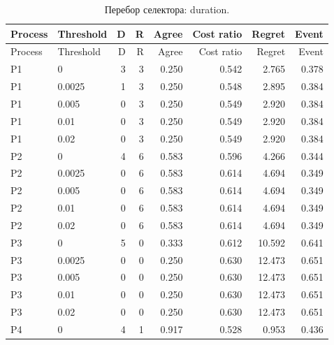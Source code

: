 \begingroup\small\setlength{\tabcolsep}{3pt}\begin{longtable}{llrrrrrr}\caption{Перебор селектора: duration.}\\\toprule

Process & Threshold & D & R & Agree & Cost ratio & Regret & Event\\\midrule\endfirsthead

\toprule Process & Threshold & D & R & Agree & Cost ratio & Regret & Event\\\midrule\endhead

P1 & 0 & 3 & 3 & 0.250 & 0.542 & 2.765 & 0.378\\

P1 & 0.0025 & 1 & 3 & 0.250 & 0.548 & 2.895 & 0.384\\

P1 & 0.005 & 0 & 3 & 0.250 & 0.549 & 2.920 & 0.384\\

P1 & 0.01 & 0 & 3 & 0.250 & 0.549 & 2.920 & 0.384\\

P1 & 0.02 & 0 & 3 & 0.250 & 0.549 & 2.920 & 0.384\\

P2 & 0 & 4 & 6 & 0.583 & 0.596 & 4.266 & 0.344\\

P2 & 0.0025 & 0 & 6 & 0.583 & 0.614 & 4.694 & 0.349\\

P2 & 0.005 & 0 & 6 & 0.583 & 0.614 & 4.694 & 0.349\\

P2 & 0.01 & 0 & 6 & 0.583 & 0.614 & 4.694 & 0.349\\

P2 & 0.02 & 0 & 6 & 0.583 & 0.614 & 4.694 & 0.349\\

P3 & 0 & 5 & 0 & 0.333 & 0.612 & 10.592 & 0.641\\

P3 & 0.0025 & 0 & 0 & 0.250 & 0.630 & 12.473 & 0.651\\

P3 & 0.005 & 0 & 0 & 0.250 & 0.630 & 12.473 & 0.651\\

P3 & 0.01 & 0 & 0 & 0.250 & 0.630 & 12.473 & 0.651\\

P3 & 0.02 & 0 & 0 & 0.250 & 0.630 & 12.473 & 0.651\\

P4 & 0 & 4 & 1 & 0.917 & 0.528 & 0.953 & 0.436\\


\end{longtable}
